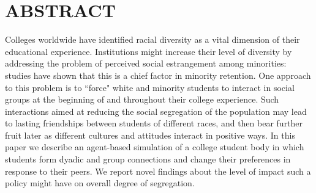 
\section*{ABSTRACT}

Colleges worldwide have identified racial diversity as a vital dimension of
their educational experience. Institutions might increase their level of
diversity by addressing the problem of perceived social estrangement among
minorities: studies have shown that this is a chief factor in minority
retention. One approach to this problem is to ``force" white and minority
students to interact in social groups at the beginning of and throughout their
college experience. Such interactions aimed at reducing the social segregation
of the population may lead to lasting friendships between students of
different races, and then bear further fruit later as different cultures and
attitudes interact in positive ways. In this paper we describe an agent-based
simulation of a college student body in which students form dyadic and group
connections and change their preferences in response to their peers. We report
novel findings about the level of impact such a policy might have on overall
degree of segregation.
